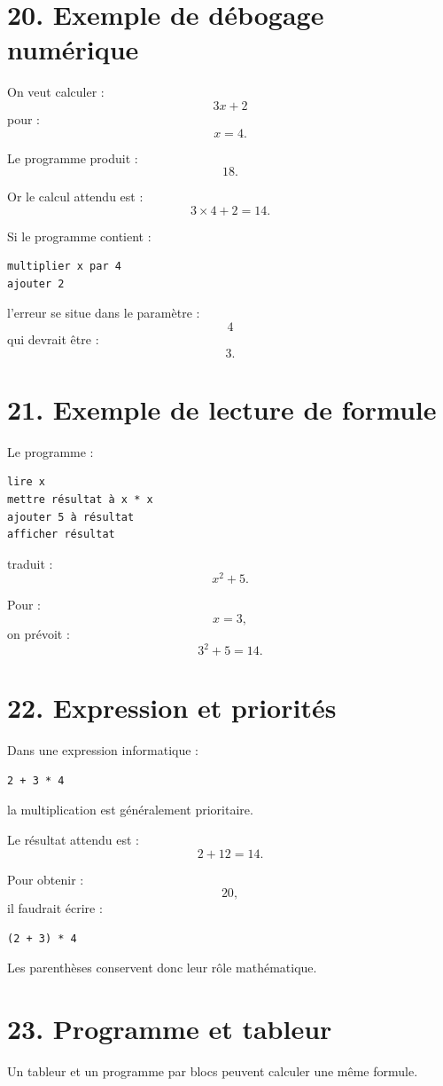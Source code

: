\section{20. Exemple de débogage numérique}

On veut calculer :
\[
3x+2
\]
pour :
\[
x=4.
\]

Le programme produit :
\[
18.
\]

Or le calcul attendu est :
\[
3\times4+2=14.
\]

Si le programme contient :
\begin{verbatim}
multiplier x par 4
ajouter 2
\end{verbatim}
l'erreur se situe dans le paramètre :
\[
4
\]
qui devrait être :
\[
3.
\]

\section{21. Exemple de lecture de formule}

Le programme :
\begin{verbatim}
lire x
mettre résultat à x * x
ajouter 5 à résultat
afficher résultat
\end{verbatim}

traduit :
\[
x^2+5.
\]

Pour :
\[
x=3,
\]
on prévoit :
\[
3^2+5=14.
\]

\section{22. Expression et priorités}

Dans une expression informatique :
\begin{verbatim}
2 + 3 * 4
\end{verbatim}
la multiplication est généralement prioritaire.

Le résultat attendu est :
\[
2+12=14.
\]

Pour obtenir :
\[
20,
\]
il faudrait écrire :
\begin{verbatim}
(2 + 3) * 4
\end{verbatim}

Les parenthèses conservent donc leur rôle mathématique.

\section{23. Programme et tableur}

Un tableur et un programme par blocs peuvent calculer une même formule.

